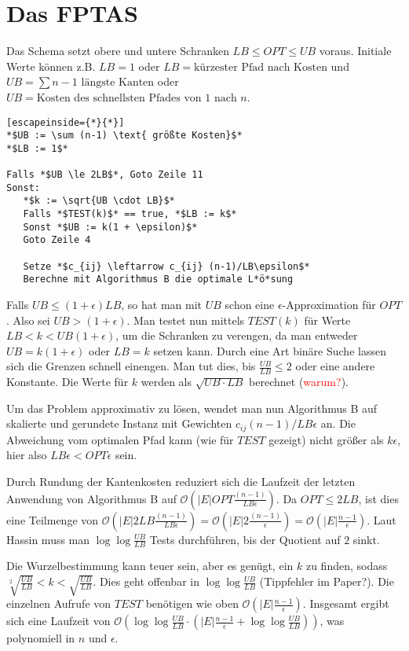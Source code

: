 \documentclass{article}
\begin{document}
\section{Das FPTAS}

Das Schema setzt obere und untere Schranken $LB \le OPT \le UB$ voraus. Initiale
Werte können z.B. $LB=1$ oder $LB=\text{kürzester Pfad nach Kosten}$ und
$UB=\sum n-1 \text{ längste Kanten}$ oder $UB=\text{Kosten des schnellsten
Pfades von $1$ nach $n$}$.

\begin{lstlisting}[escapeinside={*}{*}]
*$UB := \sum (n-1) \text{ größte Kosten}$*
*$LB := 1$*

Falls *$UB \le 2LB$*, Goto Zeile 11
Sonst:
   *$k := \sqrt{UB \cdot LB}$*
   Falls *$TEST(k)$* == true, *$LB := k$*
   Sonst *$UB := k(1 + \epsilon)$*
   Goto Zeile 4

   Setze *$c_{ij} \leftarrow c_{ij} (n-1)/LB\epsilon$*
   Berechne mit Algorithmus B die optimale L*ö*sung
\end{lstlisting}

Falls $UB \le (1+\epsilon)LB$, so hat man mit $UB$ schon eine
$\epsilon$-Approximation für $OPT$. Also sei $UB > (1+\epsilon)$. Man testet nun
mittels $TEST(k)$ für Werte $LB < k < UB(1+\epsilon)$, um die Schranken zu
verengen, da man entweder $UB=k(1+\epsilon)$ oder $LB = k$ setzen kann. Durch
eine Art binäre Suche lassen sich die Grenzen schnell einengen. Man tut dies, bis
$\frac{UB}{LB} \le 2$ oder eine andere Konstante. Die Werte für $k$ werden als
$\sqrt{UB \cdot LB}$ berechnet (\textcolor{red}{warum?}).

Um das Problem approximativ zu lösen, wendet man nun Algorithmus B auf skalierte
und gerundete Instanz mit Gewichten $c_{ij}(n-1)/LB\epsilon$ an. Die Abweichung
vom optimalen Pfad kann (wie für $TEST$ gezeigt) nicht größer als $k\epsilon$,
hier also $LB\epsilon < OPT\epsilon$ sein.

Durch Rundung der Kantenkosten reduziert sich die Laufzeit der letzten Anwendung
von Algorithmus B auf $\mathcal{O}\left(|E| OPT\frac{(n-1)}{LB\epsilon}\right)$. Da $OPT
\le 2LB$, ist dies eine Teilmenge von $\mathcal{O}(|E|
2LB\frac{(n-1)}{LB\epsilon})=\mathcal{O}(|E|
2\frac{(n-1)}{\epsilon})=\mathcal{O}\left(|E|\frac{n-1}{\epsilon}\right)$. Laut Hassin muss
man $\log{\log{\frac{UB}{LB}}}$ Tests durchführen, bis der Quotient auf $2$
sinkt.

Die Wurzelbestimmung kann teuer sein, aber es genügt, ein $k$ zu finden, sodass
$\sqrt[2]{\frac{UB}{LB}} < k < \sqrt{\frac{UB}{LB}}$. Dies geht offenbar in
$\log{\log{\frac{UB}{LB}}}$ (Tippfehler im Paper?). Die einzelnen Aufrufe von
$TEST$ benötigen wie oben $\mathcal{O}\left(|E|\frac{n-1}{\epsilon}\right)$. Insgesamt
ergibt sich eine Laufzeit von
$\mathcal{O}(\log\log{\frac{UB}{LB}\cdot(|E|\frac{n-1}{\epsilon} +
\log\log{\frac{UB}{LB}})})$, was polynomiell in $n$ und $\epsilon$.

\end{document}
